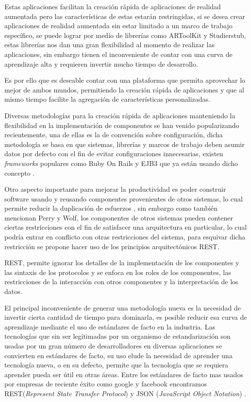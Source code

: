 \documentclass[12pt,a4paper,spanish,openany]{book}
\begin{document}
Estas aplicaciones facilitan la creación rápida de aplicaciones de realidad
aumentada pero las características de estas estarán restringidas, si se desea
crear aplicaciones de realidad aumentada sin estar limitado a un marco de
trabajo específico, se puede lograr por medio de librerías como ARToolKit
\cite{hitl} y Studierstub\cite{IntroStTubeES}, estas librerías nos dan una gran
flexibilidad al momento de realizar las aplicaciones, sin embargo tienen el inconveniente de contar con una curva de
aprendizaje alta y requieren invertir mucho tiempo de desarrollo.

Es por ello que es deseable contar con una plataforma que permita aprovechar
lo mejor de ambos mundos, permitiendo la creación rápida de
aplicaciones y que al mismo tiempo facilite la agregación de características
personalizadas.

Diversas metodologías para la creación rápida de aplicaciones manteniendo la
flexibilidad en la implementación de componentes se han venido
popularizando recientemente, una de ellas es la de convención sobre
configuración, dicha metodología se basa en que sistemas, librerías y
marcos de trabajo deben asumir datos por defecto con el fin de evitar
configuraciones innecesarias, existen \emph{frameworks} populares como Ruby On
Rails y EJB3 que  ya están usando dicho concepto \cite{citeulike:5955149}.


Otro aspecto importante para mejorar la productividad es poder construir
software usando y reusando componentes provenientes de otros sistemas, lo cual
permite reducir la duplicación de esfuerzos
\cite{Perry:1992:FSS:141874.141884}, sin embargo como también mencionan Perry y
Wolf, los componentes de otros sistemas pueden contener ciertas restricciones
con el fin de satisfacer una arquitectura en particular, lo cual podría entrar
en conflicto con otras restricciones del sistema, para esquivar dicha
restricción se propone hacer uso de los principios arquitectónicos REST.

REST, permite ignorar los detalles de la implementación de los
componentes y las sintaxis de los protocolos y se enfoca en los roles de los
componentes, las restricciones de la interacción con otros componentes y la
interpretación de los datos. \cite{restfielding}

El principal inconveniente de generar una metodología nueva es la necesidad de
invertir cierta cantidad de tiempo para dominarla, es posible reducir esa curva
de aprendizaje mediante el uso de estándares de facto en la industria. Las
tecnologías que sin ser legitimadas por un organismo de estandarización son
usadas por un gran número de desarrolladores en diversas aplicaciones se
convierten en estándares de facto, su uso elude la necesidad de aprender una
tecnología nueva, o en su defecto, permite que la tecnología que se requiera
aprender pueda ser útil en otras áreas. Entre los estándares de facto mas
usados por empresas de reciente éxito como google y facebook encontramos
REST(\emph{Represent State Transfer Protocol}) y JSON (\emph{JavaScript Object
Notation}) \cite{estoesgoogle}.
\end{document}
